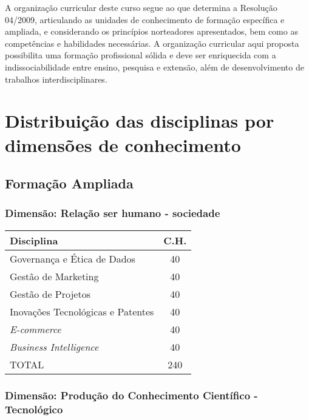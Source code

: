 \documentclass[a4paper, 12pt, openright, oneside, german, french, english, brazil]{abntex2}
\begin{document}
A organização curricular deste curso segue ao que determina a Resolução 04/2009, articulando as unidades de conhecimento de formação específica e ampliada, e considerando os princípios norteadores apresentados, bem como as competências e habilidades necessárias. A organização curricular aqui proposta possibilita uma formação profissional sólida e deve ser enriquecida com a indissociabilidade entre ensino, pesquisa e extensão, além de desenvolvimento de trabalhos interdisciplinares.

\section{Distribuição das disciplinas por dimensões de conhecimento}

\subsection{Formação Ampliada}

\subsubsection{Dimensão: Relação ser humano - sociedade}

\begin{table}[!h]
  \footnotesize
  \centering
  \begin{tabular}{|p{7cm}|c|}
    \hline
    \textbf{Disciplina} & \textbf{C.H.} \\
    \hline
    Governança e Ética de Dados & 40 \\
    \hline
    Gestão de Marketing & 40 \\
    \hline
    Gestão de Projetos & 40 \\
    \hline
    Inovações Tecnológicas e Patentes & 40 \\
    \hline
    \textit{E-commerce} & 40 \\
    \hline
    \textit{Business Intelligence} & 40 \\
    \hline
    TOTAL & 240 \\
    \hline
  \end{tabular}
\end{table}

\subsubsection{Dimensão: Produção do Conhecimento Científico - Tecnológico}
\end{document}
